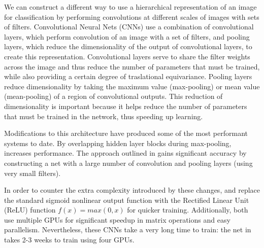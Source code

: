 \documentclass[10pt,twocolumn,letterpaper]{article}
\begin{document}
We can construct a different way to use a hierarchical representation of an image for classification
by performing convolutions at different scales of images with sets of filters.
Convolutional Neural Nets (CNNs) use a combination of convolutional layers, which perform convolution
of an image with a set of filters, and pooling layers, which reduce the dimensionality of the output
of convolutional layers, to create this representation. Convolutional layers serve to share the filter weights
across the image and thus reduce the number of parameters that must be trained, while also providing
a certain degree of traslational equivariance.
Pooling layers reduce dimensionality by taking the maximum value (max-pooling) or mean value
(mean-pooling) of a region of convolutional outputs.
This reduction of dimensionality is important because it helps reduce the number of parameters that
must be trained in the network, thus speeding up learning.

Modifications to this architecture \cite{CDBN} have produced some of the most performant
systems to date.
By overlapping hidden layer blocks during max-pooling, \cite{ImageNet} increases performance.
The approach outlined in \cite{Verydeep} gains significant accuracy by constructing a net with
a large number of convolution and pooling layers (using very small filters).

In order to counter the extra complexity introduced by these changes,
\cite{ImageNet} and \cite{Verydeep} replace the standard sigmoid nonlinear output function with the
Rectified Linear Unit (ReLU) function $f(x) = max(0, x)$ for quicker training.
Additionally, both use multiple GPUs for significant speedup in matrix operations
and easy parallelism.
Nevertheless, these CNNs take a very long time to train: the net in \cite{Verydeep}
takes 2-3 weeks to train using four GPUs.
\end{document}
